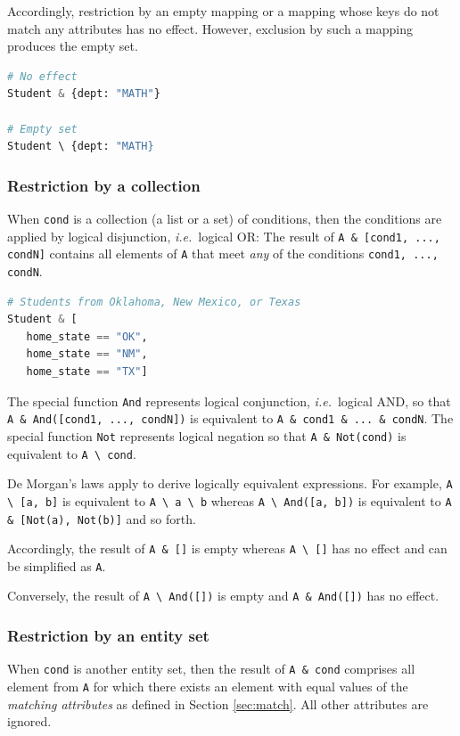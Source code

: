 \documentclass[letter,10pt]{article}
\begin{document}
Accordingly, restriction by an empty mapping or a mapping whose keys do not match any attributes has no effect.  
However, exclusion by such a mapping produces the empty set.

\begin{lstlisting}[language=Python, caption={Restriction by a mapping with no matching keys}, label={lst:res-empty-map}]
# No effect 
Student & {dept: "MATH"}

# Empty set
Student \ {dept: "MATH}
\end{lstlisting}

\subsubsection{Restriction by a collection}
When \lstinline$cond$ is a collection (a list or a set) of conditions, then the conditions are applied by logical disjunction, \emph{i.e.}\ logical {OR}:
The result of \lstinline$A & [cond1, ..., condN]$ contains all elements of \lstinline$A$ that meet \emph{any} of the conditions \lstinline$cond1, ..., condN$.

\begin{lstlisting}[language=Python, caption={Restrictions by a collection of conditions.}, label={lst:res-list}]
# Students from Oklahoma, New Mexico, or Texas
Student & [
   home_state == "OK", 
   home_state == "NM", 
   home_state == "TX"] 
\end{lstlisting}

The special function \lstinline$And$ represents logical conjunction, \emph{i.e.}\ logical {AND}, so that \lstinline$A & And([cond1, ..., condN])$ is equivalent to \lstinline$A & cond1 & ... & condN$.
The special function \lstinline$Not$ represents logical negation so that \lstinline$A & Not(cond)$ is equivalent to \lstinline$A \ cond$.

De Morgan's laws apply to derive logically equivalent expressions.  
For example, \lstinline$A \ [a, b]$ is equivalent to \lstinline$A \ a \ b$ whereas \lstinline$A \ And([a, b])$ is equivalent to \lstinline$A & [Not(a), Not(b)]$ and so forth.

Accordingly, the result of \lstinline$A & []$ is empty whereas \lstinline$A \ []$ has no effect and can be simplified as \lstinline$A$.

Conversely, the result of \lstinline$A \ And([])$ is empty and \lstinline$A & And([])$ has no effect.

\subsubsection{Restriction by an entity set}
When \lstinline$cond$ is another entity set, then the result of \lstinline$A & cond$ comprises all element from \lstinline$A$ for which there exists an element with equal values of the \emph{matching attributes}  as defined in Section \ref{sec:match}.  
All other attributes are ignored.  
\end{document}
